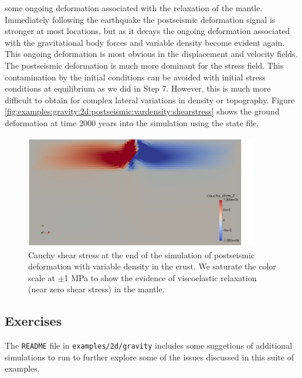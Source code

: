 some ongoing deformation associated with the relaxation of the mantle.
Immediately following the earthquake the postseismic deformation signal
is stronger at most locations, but as it decays the ongoing deformation
associated with the gravitational body forces and variable density
become evident again. This ongoing deformation is most obvious in
the displacement and velocity fields. The postseismic deformation
is much more dominant for the stress field. This contamination by
the initial conditions can be avoided with initial stress conditions
at equilibrium as we did in Step 7. However, this is much more difficult
to obtain for complex lateral variations in density or topography.
Figure \vref{fig:examples:gravity:2d:postseismic:vardensity:shearstress}
shows the ground deformation at time 2000 years into the simulation
using the state file. 

\begin{figure}
\begin{centering}
\includegraphics[width=4in]{tutorials/grav2d/figs/postseismic_vardensity-shearstress}
\par\end{centering}

\caption{Cauchy shear stress at the end of the simulation of postseismic deformation
with variable density in the crust. We saturate the color scale at
$\pm$1 MPa to show the evidence of viscoelastic relaxation (near
zero shear stress) in the mantle. \label{fig:examples:gravity:2d:postseismic:vardensity:shearstress}}
\end{figure}



\subsection{Exercises}

The \texttt{README} file in \texttt{examples/2d/gravity} includes
some suggetions of additional simulations to run to further explore
some of the issues discussed in this suite of examples.
